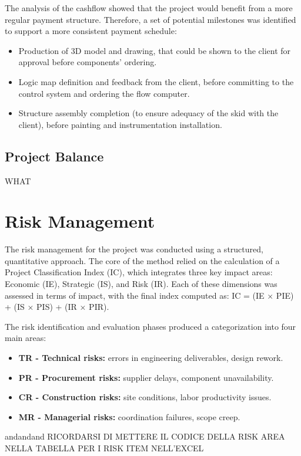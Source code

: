 \documentclass[12pt]{article}
\begin{document}
The analysis of the cashflow showed that the project would benefit from a more regular payment structure. Therefore, a set of potential milestones was identified to support a more consistent payment schedule:
\begin{itemize}
        \item Production of 3D model and drawing, that could be shown to the client for approval before components' ordering.
        \item Logic map definition and feedback from the client, before committing to the control system and ordering the flow computer.
        \item Structure assembly completion (to ensure adequacy of the skid with the client), before painting and instrumentation installation.
\end{itemize}

\subsection{Project Balance}
WHAT

\section{Risk Management}

The risk management for the project was conducted using a structured, quantitative approach. The core of the method relied on the calculation of a Project Classification Index (IC), which integrates three key impact areas: Economic (IE), Strategic (IS), and Risk (IR). Each of these dimensions was assessed in terms of impact, with the final index computed as:
IC = (IE × PIE) + (IS × PIS) + (IR × PIR).

The risk identification and evaluation phases produced a categorization into four main areas:
\begin{itemize}
        \item \textbf{TR - Technical risks:} errors in engineering deliverables, design rework.
        \item \textbf{PR - Procurement risks:} supplier delays, component unavailability.
        \item \textbf{CR - Construction risks:} site conditions, labor productivity issues.
        \item \textbf{MR - Managerial risks:} coordination failures, scope creep.
\end{itemize}

andandand RICORDARSI DI METTERE IL CODICE DELLA RISK AREA NELLA TABELLA PER I RISK ITEM NELL'EXCEL
\end{document}
